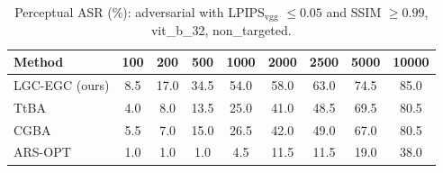 \begin{table}[t]
\centering\footnotesize
\caption{Perceptual ASR (\%): adversarial with LPIPS$_{\mathrm{vgg}}$ $\le 0.05$ and SSIM $\ge 0.99$, vit\_b\_32, non\_targeted.}
\begin{tabular}{lcccccccc}
\toprule
Method & 100 & 200 & 500 & 1000 & 2000 & 2500 & 5000 & 10000 \\
\midrule
LGC-EGC (ours) & 8.5 & 17.0 & 34.5 & 54.0 & 58.0 & 63.0 & 74.5 & 85.0 \\
TtBA & 4.0 & 8.0 & 13.5 & 25.0 & 41.0 & 48.5 & 69.5 & 80.5 \\
CGBA & 5.5 & 7.0 & 15.0 & 26.5 & 42.0 & 49.0 & 67.0 & 80.5 \\
ARS-OPT & 1.0 & 1.0 & 1.0 & 4.5 & 11.5 & 11.5 & 19.0 & 38.0 \\
\bottomrule
\end{tabular}
\end{table}
